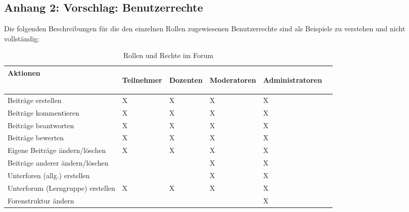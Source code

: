 
\subsection*{Anhang 2: Vorschlag: Benutzerrechte} %
\label{sub:vorschlag_rollen_und_rechte}

Die folgenden Beschreibungen für die den einzelnen Rollen zugewiesenen Benutzerrechte sind als Beispiele zu verstehen und nicht vollständig:

\begin{table}[H]
\begin{center}
\begin{footnotesize}
\begin{tabular}{| l | C{1cm} | C{1cm} | C{1cm} | C{1cm} | C{1cm} |}  \hline                       
  \textbf{Aktionen} & 
	\begin{turn}{90}\textbf{Teilnehmer\vspace{0.1cm}}\end{turn} & 
	\begin{turn}{90}\textbf{Dozenten}\end{turn}  & 
	\begin{turn}{90}\textbf{Moderatoren}\end{turn} & 
	\begin{turn}{90}\textbf{Administratoren}\end{turn} \\ \hline 
	Beiträge erstellen					& X   & X   & X  & X    \\  \hline  
	Beiträge kommentieren		& X   & X   & X  & X    \\  \hline  
	Beiträge beantworten		& X   & X   & X  & X    \\  \hline  
	Beiträge bewerten		& X   & X   & X  & X    \\  \hline  
	Eigene Beiträge ändern/löschen		& X   & X   & X  & X    \\  \hline  
	Beiträge anderer ändern/löschen		&     &     & X  & X    \\  \hline  
	Unterforen (allg.) erstellen		&     &     & X  & X    \\  \hline  
	Unterforum (Lerngruppe) erstellen		&  X   & X    & X  & X    \\  \hline  
	Forenstruktur ändern	&     &     &   & X    \\  \hline  
\end{tabular}
\end{footnotesize}
\caption{Rollen und Rechte im Forum}
\label{tab:rundrforum}
\end{center}
\end{table}

